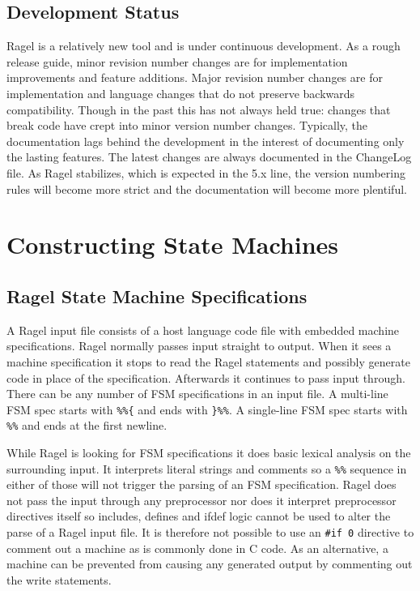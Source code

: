 \documentclass[letterpaper,11pt,oneside]{book}
\begin{document}
\section{Development Status}

Ragel is a relatively new tool and is under continuous development. As a rough
release guide, minor revision number changes are for implementation
improvements and feature additions. Major revision number changes are for
implementation and language changes that do not preserve backwards
compatibility. Though in the past this has not always held true: changes that
break code have crept into minor version number changes. Typically, the
documentation lags behind the development in the interest of documenting only
the lasting features. The latest changes are always documented in the ChangeLog
file. As Ragel stabilizes, which is expected in the 5.x line, the version
numbering rules will become more strict and the documentation will become more
plentiful.


\chapter{Constructing State Machines}

\section{Ragel State Machine Specifications}

A Ragel input file consists of a host language code file with embedded machine
specifications.  Ragel normally passes input straight to output.  When it sees
a machine specification it stops to read the Ragel statements and possibly generate
code in place of the specification.
Afterwards it continues to pass input through.  There
can be any number of FSM specifications in an input file. A multi-line FSM spec
starts with \verb|%%{| and ends with \verb|}%%|. A single-line FSM spec starts
with \verb|%%| and ends at the first newline.  

While Ragel is looking for FSM specifications it does basic lexical analysis on
the surrounding input. It interprets literal strings and comments so a
\verb|%%| sequence in either of those will not trigger the parsing of an FSM
specification. Ragel does not pass the input through any preprocessor nor does it
interpret preprocessor directives itself so includes, defines and ifdef logic
cannot be used to alter the parse of a Ragel input file. It is therefore not
possible to use an \verb|#if 0| directive to comment out a machine as is
commonly done in C code. As an alternative, a machine can be prevented from
causing any generated output by commenting out the write statements.
\end{document}
